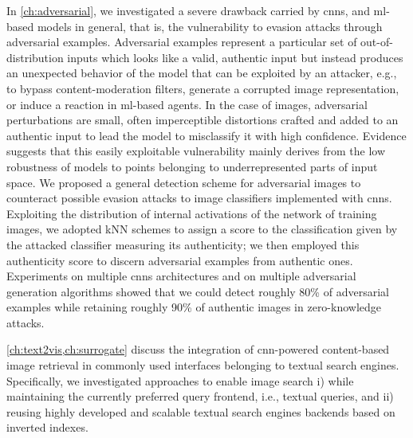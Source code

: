 In \ref{ch:adversarial}, we investigated a severe drawback carried by \glspl{cnn}, and \gls{ml}-based models in general, that is, the vulnerability to evasion attacks through adversarial examples.
Adversarial examples represent a particular set of out-of-distribution inputs which looks like a valid, authentic input but instead produces an unexpected behavior of the model that can be exploited by an attacker, e.g., to bypass content-moderation filters, generate a corrupted image representation, or induce a reaction in \gls{ml}-based agents.
In the case of images, adversarial perturbations are small, often imperceptible distortions crafted and added to an authentic input to lead the model to misclassify it with high confidence.
Evidence suggests that this easily exploitable vulnerability mainly derives from the low robustness of models to points belonging to underrepresented parts of input space.
We proposed a general detection scheme for adversarial images to counteract possible evasion attacks to image classifiers implemented with \glspl{cnn}.
Exploiting the distribution of internal activations of the network of training images, we adopted kNN schemes to assign a score to the classification given by the attacked classifier measuring its authenticity;
we then employed this authenticity score to discern adversarial examples from authentic ones.
Experiments on multiple \glspl{cnn} architectures and on multiple adversarial generation algorithms showed that we could detect roughly 80\% of adversarial examples while retaining roughly 90\% of authentic images in zero-knowledge attacks.

\ref{ch:text2vis,ch:surrogate} discuss the integration of \gls{cnn}-powered content-based image retrieval in commonly used interfaces belonging to textual search engines.
Specifically, we investigated approaches to enable image search i) while maintaining the currently preferred query frontend, i.e., textual queries, and ii) reusing highly developed and scalable textual search engines backends based on inverted indexes.

